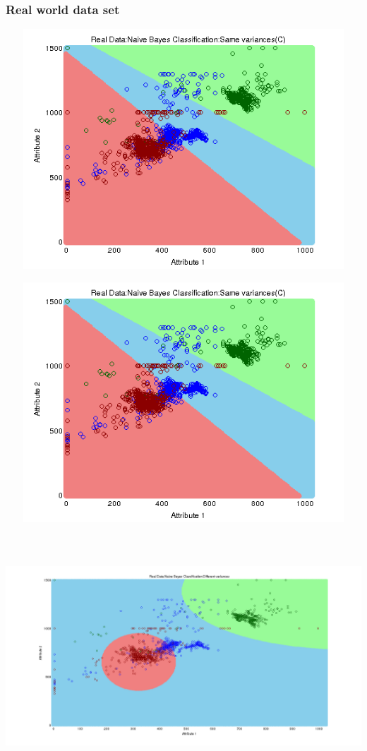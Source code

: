 \documentclass[a4paper]{article}
\begin{document}
	\subsubsection{Real world data set}
		\centerline{\includegraphics[width=160mm,height=90mm]{plots/naivebayes/real/same_var.png}}
		\centerline{\includegraphics[width=160mm,height=90mm]{plots/naivebayes/real/same_var.png}}
		\centerline{\includegraphics[width=160mm,height=90mm]{plots/naivebayes/real/diff_var.png}}
		
\end{document}
